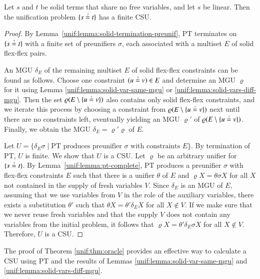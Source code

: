 \begin{theorem}
    \label{unif:thm:oracle}
    Let $s$ and $t$ be
    solid terms that share no free variables,
    and let $s$ be linear.
    Then the unification problem $\{s \unif t\}$ has a finite CSU.
\end{theorem}
\begin{proof}
    By Lemma~\ref{unif:lemma:solid-termination-preunif}, 
    PT terminates on $\{s \unif t\}$ with a finite set of preunifiers $\sigma$,
    each associated with a multiset $E$ of solid flex-flex pairs.

    
    An MGU $\delta_E$ of the remaining multiset $E$
    of solid flex-flex constraints can be found as follows.
    Choose one constraint $(u \unif v) \in E$ and determine an MGU $\varrho$ for it
    using Lemma \ref{unif:lemma:solid-var-same-mgu} or
    \ref{unif:lemma:solid-vars-diff-mgu}.
    Then the set $\varrho(E\setminus\{u \unif v\})$ also contains only solid flex-flex constraints,
    and we iterate this process by choosing a constraint from $\varrho(E\setminus\{u \unif v\})$ next
    until there are no constraints left, eventually
    yielding an MGU $\varrho'$ of $\varrho(E\setminus\{u \unif v\})$. Finally, we obtain the MGU
    $\delta_E = \varrho'\varrho$ of $E$.

    Let $U = \{ \delta_E\sigma
    \mid \text{PT produces preunifier $\sigma$ with constraints }E\}$. 
    By termination of PT, $U$ is finite.
    We show that $U$ is a CSU. 
    Let $\varrho$ be an arbitrary unifier for $\{ s \unif t\}$. By Lemma~\ref{unif:lemma:pt-complete}, 
    PT produces a preunifier $\sigma$ with flex-flex constraints $E$
    such that there is a unifier $\theta$ of $E$ and
    $\varrho X = \theta\sigma X$ for all $X$ not contained in the supply of fresh variables $V$. 
    Since
    $\delta_E$ is an MGU of $E$,
    assuming that we use variables from $V$ in the role of the auxiliary variables,
    there exists a
    substitution $\theta'$ such that $\theta X = \theta' \delta_E X$ for all $X \not\in V$.
    If we make sure that we never reuse fresh variables and that the supply $V$ does not contain any variables from the initial problem,
    it follows that $\varrho X = \theta' \delta_E\sigma X$ for all $X \not\in V$.
    Therefore, $U$ is a CSU.
\end{proof}

The proof of Theorem \ref{unif:thm:oracle}
provides an effective way to calculate a CSU using PT and the results
of Lemmas \ref{unif:lemma:solid-var-same-mgu} and \ref{unif:lemma:solid-vars-diff-mgu}.

